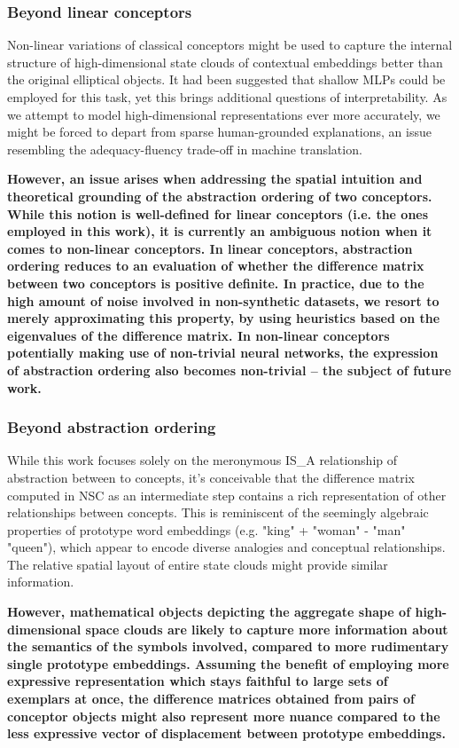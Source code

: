 \subsubsection{Beyond linear conceptors}

Non-linear variations of classical conceptors might be used to capture the internal structure of high-dimensional state clouds of contextual embeddings better than the original elliptical objects. It had been suggested that shallow MLPs could be employed for this task, yet this brings additional questions of interpretability. As we attempt to model high-dimensional representations ever more accurately, we might be forced to depart from sparse human-grounded explanations, an issue resembling the adequacy-fluency trade-off in machine translation.

\textbf{However, an issue arises when addressing the spatial intuition and theoretical grounding of the abstraction ordering of two conceptors. While this notion is well-defined for linear conceptors (i.e. the ones employed in this work), it is currently an ambiguous notion when it comes to non-linear conceptors. In linear conceptors, abstraction ordering reduces to an evaluation of whether the difference matrix between two conceptors is positive definite. In practice, due to the high amount of noise involved in non-synthetic datasets, we resort to merely approximating this property, by using heuristics based on the eigenvalues of the difference matrix. In non-linear conceptors potentially making use of non-trivial neural networks, the expression of abstraction ordering also becomes non-trivial -- the subject of future work.} 

\subsubsection{Beyond abstraction ordering}

While this work focuses solely on the meronymous IS\_A relationship of abstraction between to concepts, it's conceivable that the difference matrix computed in NSC as an intermediate step contains a rich representation of other relationships between concepts. This is reminiscent of the seemingly algebraic properties of prototype word embeddings (e.g. "king" + "woman" - "man" ~ "queen"), which appear to encode diverse analogies and conceptual relationships. The relative spatial layout of entire state clouds might provide similar information.

\textbf{However, mathematical objects depicting the aggregate shape of high-dimensional space clouds are likely to capture more information about the semantics of the symbols involved, compared to more rudimentary single prototype embeddings. Assuming the benefit of employing more expressive representation which stays faithful to large sets of exemplars at once, the difference matrices obtained from pairs of conceptor objects might also represent more nuance compared to the less expressive vector of displacement between prototype embeddings.} 

